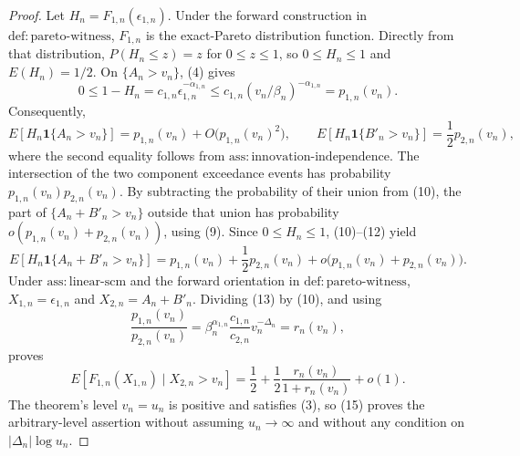 \documentclass{article}
\begin{document}
\begin{proof}
Let \(H_n=F_{1,n}(\epsilon_{1,n})\). Under the forward construction in \(\mathrm{def{:}pareto\text{-}witness}\), \(F_{1,n}\) is the exact-Pareto distribution function. Directly from that distribution, \(P(H_n\leq z)=z\) for \(0\leq z\leq1\), so \(0\leq H_n\leq1\) and \(E(H_n)=1/2\). On \(\{A_n>v_n\}\), (4) gives
\[
0\leq1-H_n
=c_{1,n}\epsilon_{1,n}^{-\alpha_{1,n}}
\leq c_{1,n}(v_n/\beta_n)^{-\alpha_{1,n}}
=p_{1,n}(v_n).
\tag{11}
\]
Consequently,
\[
E[H_n\mathbf 1\{A_n>v_n\}]
=p_{1,n}(v_n)+O\bigl(p_{1,n}(v_n)^2\bigr),
\qquad
E[H_n\mathbf 1\{B'_n>v_n\}]
=\frac12p_{2,n}(v_n),
\tag{12}
\]
where the second equality follows from \(\mathrm{ass{:}innovation\text{-}independence}\). The intersection of the two component exceedance events has probability \(p_{1,n}(v_n)p_{2,n}(v_n)\). By subtracting the probability of their union from (10), the part of \(\{A_n+B'_n>v_n\}\) outside that union has probability \(o(p_{1,n}(v_n)+p_{2,n}(v_n))\), using (9). Since \(0\leq H_n\leq1\), (10)--(12) yield
\[
E[H_n\mathbf 1\{A_n+B'_n>v_n\}]
=p_{1,n}(v_n)+\frac12p_{2,n}(v_n)
+o\bigl(p_{1,n}(v_n)+p_{2,n}(v_n)\bigr).
\tag{13}
\]
Under \(\mathrm{ass{:}linear\text{-}scm}\) and the forward orientation in \(\mathrm{def{:}pareto\text{-}witness}\), \(X_{1,n}=\epsilon_{1,n}\) and \(X_{2,n}=A_n+B'_n\). Dividing (13) by (10), and using
\[
\frac{p_{1,n}(v_n)}{p_{2,n}(v_n)}
=\beta_n^{\alpha_{1,n}}\frac{c_{1,n}}{c_{2,n}}v_n^{-\Delta_n}
=r_n(v_n),
\tag{14}
\]
proves
\[
E[F_{1,n}(X_{1,n})\mid X_{2,n}>v_n]
=\frac12+\frac12\frac{r_n(v_n)}{1+r_n(v_n)}+o(1).
\tag{15}
\]
The theorem's level \(v_n=u_n\) is positive and satisfies (3), so (15) proves the arbitrary-level assertion without assuming \(u_n\to\infty\) and without any condition on \(|\Delta_n|\log u_n\).


\end{proof}
\end{document}
